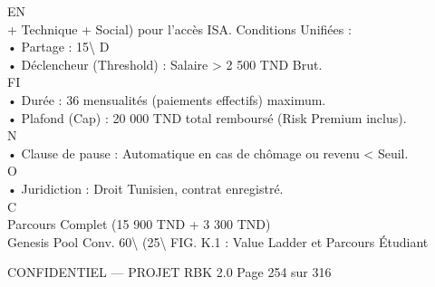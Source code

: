 \documentclass[12pt,landscape,a4paper]{article}
\newenvironment{confidential}
{\begin{tcolorbox}[
    colback=rbkred!5!white,
    colframe=rbkred!75!black,
    title=CONFIDENTIEL,
    fonttitle=\bfseries\color{white},
    coltitle=rbkred!75!black,
    breakable,
    enhanced,
    frame hidden,
    borderline west={2pt}{0pt}{rbkred!75!black}
]}
{\end{tcolorbox}}
\begin{document}
EN\\
+ Technique + Social) pour l’accès ISA. Conditions Unifiées :\\
\vspace{0.5em}
• Partage : 15\textbackslash{}%
\vspace{0.5em}
\vspace{0.5em}
\vspace{0.5em}
\vspace{0.5em}
D\\
• Déclencheur (Threshold) : Salaire \textgreater{} 2 500 TND Brut.\\
\vspace{0.5em}
\vspace{0.5em}
\vspace{0.5em}
\vspace{0.5em}
FI\\
• Durée : 36 mensualités (paiements effectifs) maximum.\\
\vspace{0.5em}
• Plafond (Cap) : 20 000 TND total remboursé (Risk Premium inclus).\\
N\\
• Clause de pause : Automatique en cas de chômage ou revenu \textless{} Seuil.\\
O\\
• Juridiction : Droit Tunisien, contrat enregistré.\\
C\\
\vspace{0.5em}
\vspace{0.5em}
Parcours Complet (15 900 TND + 3 300 TND)\\
\vspace{0.5em}
\vspace{0.5em}
Genesis Pool  Conv. 60\textbackslash{}%
(25\textbackslash{}%
\vspace{0.5em}
FIG. K.1 : Value Ladder et Parcours Étudiant\\
\vspace{0.5em}
\vspace{0.5em}
\begin{confidential}CONFIDENTIEL — PROJET RBK 2.0                                           Page 254 sur 316\end{confidential}
\end{document}
